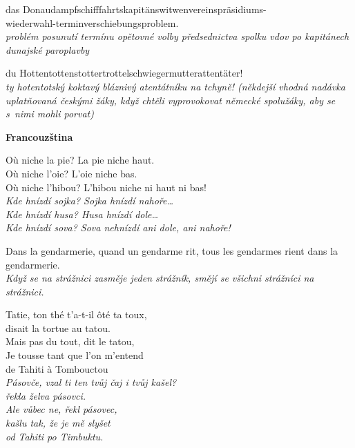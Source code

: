 \medskip

\noindent
das Donaudampfschifffahrtskapitänswitwenvereinspräsidiums- \\wiederwahl-terminverschiebungsproblem. \\
\textit{problém posunutí termínu opětovné volby předsednictva spolku vdov po kapitánech dunajské paroplavby}

\medskip

\noindent
du Hottentottenstottertrottelschwiegermutterattentäter! \\
\textit{ty hotentotský koktavý bláznivý atentátníku na tchyně! (někdejší vhodná nadávka uplatňovaná českými žáky, když chtěli vyprovokovat německé spolužáky, aby se s nimi mohli porvat)}

\medskip










\bigskip
\noindent
\textbf{Francouzština}

\medskip

\noindent
Où niche la pie? La pie niche haut. \\
Où niche l'oie? L'oie niche bas. \\
Où niche l'hibou? L'hibou niche ni haut ni bas!  \\
\textit{Kde hnízdí sojka? Sojka hnízdí nahoře\ldots} \\
\textit{Kde hnízdí husa? Husa hnízdí dole\ldots} \\
\textit{Kde hnízdí sova? Sova nehnízdí ani dole, ani nahoře! }\\

\medskip

\noindent
Dans la gendarmerie, quand un gendarme rit, tous les gendarmes rient dans la gendarmerie.\\
\textit{Když se na strážnici zasměje jeden strážník, smějí se všichni strážníci na strážnici.}

\medskip

\noindent
Tatie, ton thé t'a-t-il ôté ta toux, \\
disait la tortue au tatou. \\
Mais pas du tout, dit le tatou, \\
Je tousse tant que l'on m'entend  \\
de Tahiti à Tombouctou  \\
\textit{Pásovče, vzal ti ten tvůj čaj i tvůj kašel?} \\
\textit{řekla želva pásovci.}  \\
\textit{Ale vůbec ne, řekl pásovec,}  \\
\textit{kašlu tak, že je mě slyšet \\ od Tahiti po Timbuktu.}

